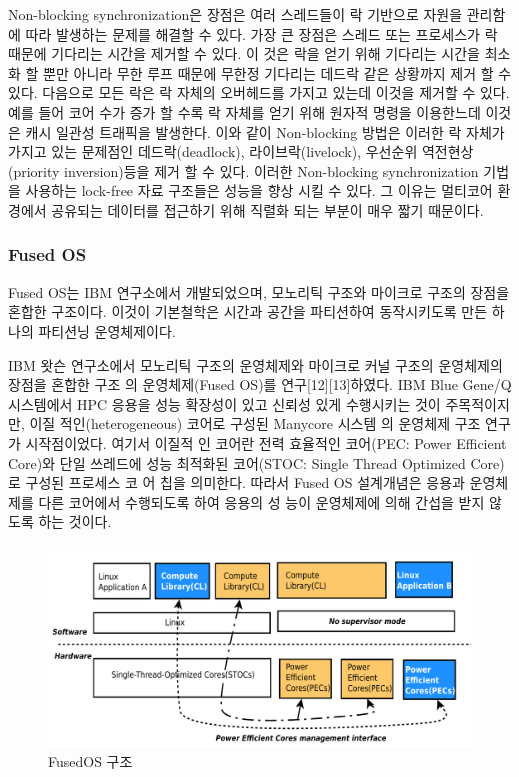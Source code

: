 Non-blocking synchronization은 장점은 여러 스레드들이 락 기반으로 자원을 관리함에 따라
 발생하는 문제를 해결할 수 있다. 
가장 큰 장점은 스레드 또는 프로세스가 락 때문에 기다리는 시간을 제거할 수 있다.
이 것은 락을 얻기 위해 기다리는 시간을 최소화 할 뿐만 아니라 무한 루프 때문에 무한정 기다리는 
데드락 같은 상황까지 제거 할 수 있다. 
다음으로 모든 락은 락 자체의 오버헤드를 가지고 있는데 이것을 제거할 수 있다. 
예를 들어 코어 수가 증가 할 수록 락 자체를 얻기 위해 원자적 명령을 이용한느데 이것은 캐시 일관성 트래픽을 
발생한다. 
이와 같이 Non-blocking 방법은 이러한 락 자체가 가지고 있는 문제점인 데드락(deadlock), 라이브락(livelock), 
우선순위 역전현상(priority inversion)등을 제거 할 수 있다. 
이러한 Non-blocking synchronization 기법을 사용하는 lock-free 자료 구조들은 성능을 향상 시킬 수 있다. 
그 이유는 멀티코어 환경에서 공유되는 데이터를 접근하기 위해 직렬화 되는 부분이 매우 짧기 때문이다. 


\subsubsection{Fused OS}

Fused OS는 IBM 연구소에서 개발되었으며, 모노리틱 구조와 마이크로 구조의 장점을 혼합한 구조이다. 
이것이 기본철학은 시간과 공간을 파티션하여 동작시키도록 만든 하나의 파티션닝 운영체제이다.

IBM 왓슨 연구소에서 모노리틱 구조의 운영체제와
마이크로 커널 구조의 운영체제의 장점을 혼합한 구조
의 운영체제(Fused OS)를 연구[12][13]하였다. IBM
Blue Gene/Q 시스템에서 HPC 응용을 성능 확장성이
있고 신뢰성 있게 수행시키는 것이 주목적이지만, 이질
적인(heterogeneous) 코어로 구성된 Manycore 시스템
의 운영체제 구조 연구가 시작점이었다. 여기서 이질적
인 코어란 전력 효율적인 코어(PEC: Power Efficient
Core)와 단일 쓰레드에 성능 최적화된 코어(STOC:
Single Thread Optimized Core)로 구성된 프로세스 코
어 칩을 의미한다. 따라서 Fused OS 설계개념은 응용과
운영체제를 다른 코어에서 수행되도록 하여 응용의 성
능이 운영체제에 의해 간섭을 받지 않도록 하는 것이다.

\begin{figure}[h!]
    \centering
    \includegraphics[width=1\textwidth]{fig/fusedos/fusedos}
    \caption{FusedOS 구조}
  \label{fig:FusedOS}
\end{figure}

